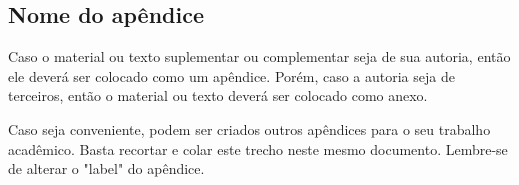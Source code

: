 \begin{apendicesenv}

\chapter{Nome do apêndice} %
\label{chap:apendiceA}

Caso o material ou texto suplementar ou complementar seja de sua autoria, então ele deverá ser colocado como um apêndice. Porém, caso a autoria seja de terceiros, então o material ou texto deverá ser colocado como anexo.

Caso seja conveniente, podem ser criados outros apêndices para o seu trabalho acadêmico. Basta recortar e colar este trecho neste mesmo documento. Lembre-se de alterar o "label"{} do apêndice.


\end{apendicesenv}
